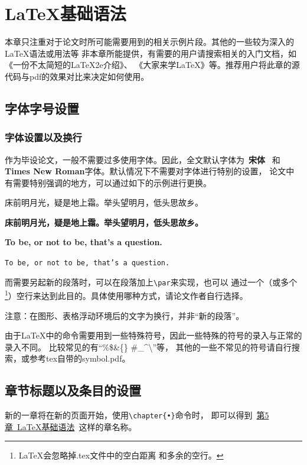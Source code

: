 \chapter{\LaTeX{}基础语法}
\label{chapter-basic}
本章只注重对于论文时所可能需要用到的相关示例片段。其他的一些较为深入的\LaTeX{}语法或用法等
非本章所能提供，有需要的用户请搜索相关的入门文档，如《一份不太简短的\LaTeX2e{}介绍》、
《大家来学\LaTeX{}》等。推荐用户将此章的源代码与pdf的效果对比来决定如何使用。

\section{字体字号设置}
\label{sec-font}

\subsection{字体设置以及换行}
\label{subsec-font}
作为毕设论文，一般不需要过多使用字体。因此，全文默认字体为~{\bf 宋体}~
和{\bf Times New Roman}字体。默认情况下不需要对字体进行特别的设置，
论文中有需要特别强调的地方，可以通过如下的示例进行更换。

{\heiti 床前明月光，疑是地上霜。举头望明月，低头思故乡。}

{\bf 床前明月光，疑是地上霜。举头望明月，低头思故乡。}

\textbf{To be, or not to be, that's a question.}

\texttt{To be, or not to be, that's a question.}

而需要另起新的段落时，可以在段落加上\verb|\par|来实现，也可以
通过一个（或多个\footnote{\LaTeX{}会忽略掉.tex文件中的空白距离
和多余的空行。}）空行来达到此目的。具体使用哪种方式，请论文作者自行选择。

{\heiti 注意：}在图形、表格浮动环境后的文字为换行，并非“新的段落”。

由于\LaTeX{}中的命令需要用到一些特殊符号，因此一些特殊的符号的录入与正常的录入不同。
比较常见的有“\%\quad\$\quad\&\quad\{\quad\}
\quad\#\quad\_\quad\^{}\quad\textbackslash”等，
其他的一些不常见的符号请自行搜索，或参考tex自带的symbol.pdf。

\section{章节标题以及条目的设置}
\label{sec-chaptitle}
新的一章将在新的页面开始，使用\verb|\chapter{•}|命令时，
即可以得到~\hyperref[chapter-basic]{第5章~\LaTeX{}基础语法}~这样的章名称。

